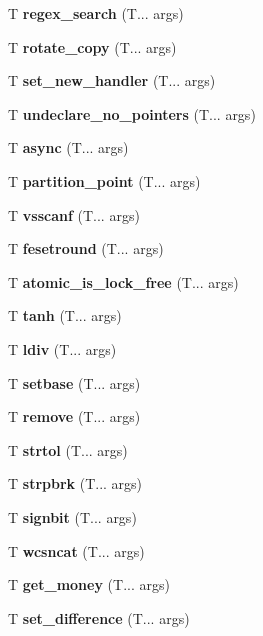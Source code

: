 \begin{DoxyCompactItemize}
\mbox{\label{regex_search}} 
T \textbf{ regex\+\_\+search} (T... args)
\item 
\mbox{\label{rotate_copy}} 
T \textbf{ rotate\+\_\+copy} (T... args)
\item 
\mbox{\label{set_new_handler}} 
T \textbf{ set\+\_\+new\+\_\+handler} (T... args)
\item 
\mbox{\label{undeclare_no_pointers}} 
T \textbf{ undeclare\+\_\+no\+\_\+pointers} (T... args)
\item 
\mbox{\label{async}} 
T \textbf{ async} (T... args)
\item 
\mbox{\label{partition_point}} 
T \textbf{ partition\+\_\+point} (T... args)
\item 
\mbox{\label{vfscanf}} 
T \textbf{ vsscanf} (T... args)
\item 
\mbox{\label{feround}} 
T \textbf{ fesetround} (T... args)
\item 
\mbox{\label{atomic_is_lock_free}} 
T \textbf{ atomic\+\_\+is\+\_\+lock\+\_\+free} (T... args)
\item 
\mbox{\label{tanh}} 
T \textbf{ tanh} (T... args)
\item 
\mbox{\label{div}} 
T \textbf{ ldiv} (T... args)
\item 
\mbox{\label{setbase}} 
T \textbf{ setbase} (T... args)
\item 
\mbox{\label{remove}} 
T \textbf{ remove} (T... args)
\item 
\mbox{\label{strtol}} 
T \textbf{ strtol} (T... args)
\item 
\mbox{\label{strpbrk}} 
T \textbf{ strpbrk} (T... args)
\item 
\mbox{\label{signbit}} 
T \textbf{ signbit} (T... args)
\item 
\mbox{\label{wcsncat}} 
T \textbf{ wcsncat} (T... args)
\item 
\mbox{\label{get_money}} 
T \textbf{ get\+\_\+money} (T... args)
\item 
\mbox{\label{set_difference}} 
T \textbf{ set\+\_\+difference} (T... args)
\item 
\mbox{\label{ref}} 

\end{DoxyCompactItemize}
